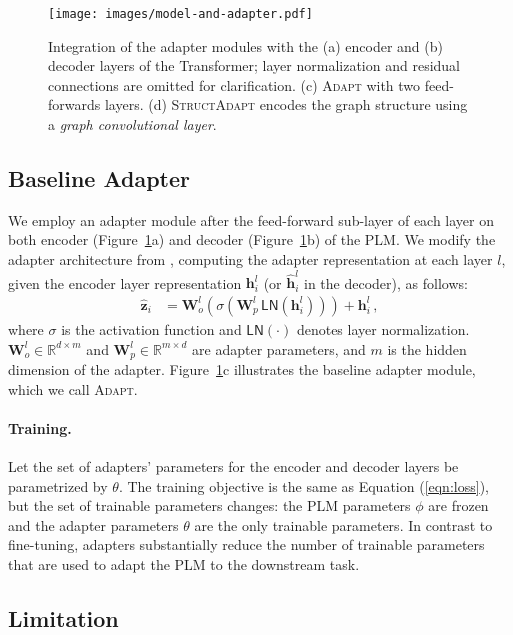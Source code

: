 \documentclass[11pt]{article}
\newcommand{\graphadapter}{{\small\textsc{StructAdapt}}\xspace}
\newcommand{\vanilladapter}{{\small\textsc{Adapt}}\xspace}
\begin{document}
\begin{figure}[t]
    \centering
    \texttt{[image: images/model-and-adapter.pdf]}
    \caption{Integration of the adapter modules with the (a) encoder and (b) decoder layers of the Transformer; layer normalization and residual connections are omitted for clarification. (c) \vanilladapter with two feed-forwards layers. (d) \graphadapter encodes the graph structure using a \emph{graph convolutional layer}.}
    \label{fig:adapterarc}
\end{figure}

\subsection{Baseline Adapter} We employ an adapter module after the feed-forward sub-layer of each layer on both encoder (Figure~\ref{fig:adapterarc}a) and decoder (Figure~\ref{fig:adapterarc}b) of the PLM. We modify the adapter architecture from \citet{pmlr-v97-houlsby19a}, computing the adapter representation at each layer $l$, given the encoder layer representation $\mathbf{h}_{i}^{l}$ (or $\hat{\mathbf{h}}_{i}^{l}$ in the decoder), as follows:
\begin{align}
\hat{\mathbf{z}}_i &= \mathbf{W}_o^{l} ( \sigma (\mathbf{W}^{l}_p \,  {\scriptstyle\mathsf{LN}}(\mathbf{h}^{l}_i))) + \mathbf{h}^{l}_i \, ,
\end{align}
where $\sigma$ is the activation function and ${\scriptstyle\mathsf{LN}}(\cdot)$ denotes layer normalization. $\mathbf{W}^{l}_o \in \mathbb{R}^{d \times m}$ and $\mathbf{W}^{l}_p \in \mathbb{R}^{m \times d}$ are adapter parameters, and $m$ is the hidden dimension of the adapter.
Figure~\ref{fig:adapterarc}c illustrates the baseline adapter module, which we call \vanilladapter. 

\paragraph{Training.} Let the set of adapters' parameters for the encoder and decoder layers be parametrized by $\theta$. The training objective is the same as Equation (\ref{eqn:loss}), but the set of trainable parameters changes: the PLM parameters $\phi$ are frozen and the adapter parameters $\theta$ are the only trainable parameters. In contrast to fine-tuning, adapters substantially reduce the number of trainable parameters that are used to adapt the PLM to the downstream task.

\subsection{Limitation}
\label{sec:intuition}
\end{document}
